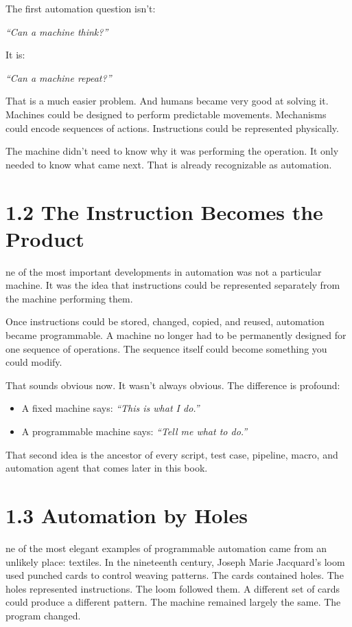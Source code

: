 \documentclass[11pt, a4paper, openany]{book}
\newcommand{\initialcap}[1]{{\fontfamily{lmss}\selectfont\huge\textbf{#1}}}
\begin{document}
The first automation question isn't:
\begin{center}
\textit{``Can a machine think?''}
\end{center}
It is:
\begin{center}
\textit{``Can a machine repeat?''}
\end{center}

That is a much easier problem. And humans became very good at solving it. Machines could be designed to perform predictable movements. Mechanisms could encode sequences of actions. Instructions could be represented physically.

The machine didn't need to know why it was performing the operation. It only needed to know what came next. That is already recognizable as automation.

\section{1.2 The Instruction Becomes the Product}
\noindent \initialcap{O}ne of the most important developments in automation was not a particular machine. It was the idea that instructions could be represented separately from the machine performing them.

Once instructions could be stored, changed, copied, and reused, automation became programmable. A machine no longer had to be permanently designed for one sequence of operations. The sequence itself could become something you could modify.

That sounds obvious now. It wasn't always obvious. The difference is profound:
\begin{itemize}
    \item A fixed machine says: \textit{``This is what I do.''}
    \item A programmable machine says: \textit{``Tell me what to do.''}
\end{itemize}

That second idea is the ancestor of every script, test case, pipeline, macro, and automation agent that comes later in this book.

\section{1.3 Automation by Holes}
\noindent \initialcap{O}ne of the most elegant examples of programmable automation came from an unlikely place: textiles. In the nineteenth century, Joseph Marie Jacquard's loom used punched cards to control weaving patterns. The cards contained holes. The holes represented instructions. The loom followed them. A different set of cards could produce a different pattern. The machine remained largely the same. The program changed.
\end{document}
